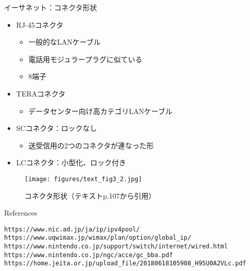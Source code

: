 \documentclass[12pt,aspectratio=169]{beamer}
\begin{document}
\begin{frame}{イーサネット：コネクタ形状}

    \begin{minipage}{0.48\textwidth}
      \small
      \begin{itemize}
        \item RJ-45コネクタ
        \begin{itemize}
          \item 一般的なLANケーブル
          \item 電話用モジュラープラグに似ている
          \item 8端子
        \end{itemize}
        \item TERAコネクタ
        \begin{itemize}
          \item データセンター向け\cite{jeitacat8}高カテゴリLANケーブル
        \end{itemize}
        \item SCコネクタ：ロックなし
        \begin{itemize}
          \item 送受信用の2つのコネクタが連なった形
        \end{itemize}
        \item LCコネクタ：小型化、ロック付き
      \end{itemize}
    \end{minipage}
    \hfill
    \begin{minipage}{0.48\textwidth}
      \begin{figure}
        \centering
        \texttt{[image: figures/text\_fig3\_2.jpg]}
        \label{fig:connector}
        \caption{コネクタ形状（テキストp.107から引用）}
      \end{figure}
    \end{minipage}

\end{frame}




\begin{frame}{References}

  \begin{thebibliography}{99}
    \beamertemplatetextbibitems
     \texttt{https://www.nic.ad.jp/ja/ip/ipv4pool/}
     \texttt{https://www.uqwimax.jp/wimax/plan/option/global\_ip/}
     \texttt{https://www.nintendo.co.jp/support/switch/internet/wired.html}
     \texttt{https://www.nintendo.co.jp/ngc/acce/gc\_bba.pdf}
     \texttt{https://home.jeita.or.jp/upload\_file/20180618105908\_H95U0A2VLc.pdf}
  \end{thebibliography}

\end{frame}
\end{document}
